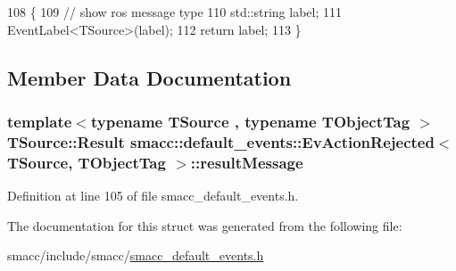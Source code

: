 \begin{DoxyCode}
108   \{
109     \textcolor{comment}{// show ros message type}
110     std::string label;
111     EventLabel<TSource>(label);
112     \textcolor{keywordflow}{return} label;
113   \}
\end{DoxyCode}


\subsection{Member Data Documentation}
\subsubsection[{\texorpdfstring{result\+Message}{resultMessage}}]{\setlength{\rightskip}{0pt plus 5cm}template$<$typename T\+Source , typename T\+Object\+Tag $>$ T\+Source\+::\+Result {\bf smacc\+::default\+\_\+events\+::\+Ev\+Action\+Rejected}$<$ T\+Source, T\+Object\+Tag $>$\+::result\+Message}\hypertarget{structsmacc_1_1default__events_1_1EvActionRejected_a40b6bcf337a76104499c82d0c4d5a49f}{}\label{structsmacc_1_1default__events_1_1EvActionRejected_a40b6bcf337a76104499c82d0c4d5a49f}


Definition at line 105 of file smacc\+\_\+default\+\_\+events.\+h.



The documentation for this struct was generated from the following file\+:\begin{DoxyCompactItemize}
\item 
smacc/include/smacc/\hyperlink{smacc__default__events_8h}{smacc\+\_\+default\+\_\+events.\+h}\end{DoxyCompactItemize}
